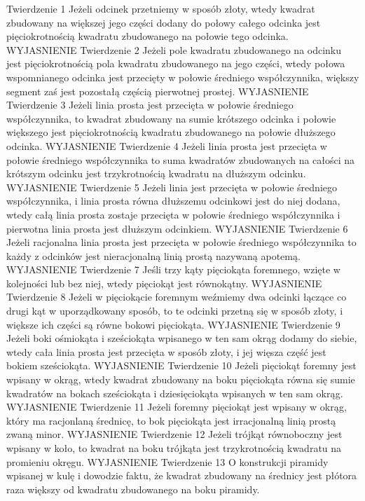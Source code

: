     Twierdzenie 1
    Jeżeli odcinek przetniemy w sposób złoty, wtedy kwadrat zbudowany na większej jego części dodany do połowy całego odcinka jest pięciokrotnością kwadratu zbudowanego na połowie tego odcinka.
    WYJASNIENIE
Twierdzenie 2
    Jeżeli pole kwadratu zbudowanego na odcinku jest pięciokrotnością pola kwadratu zbudowanego na jego części, wtedy połowa wspomnianego odcinka jest przecięty w połowie średniego współczynnika, większy segment zaś jest pozostałą częścią pierwotnej prostej.
    WYJASNIENIE
Twierdzenie 3
    Jeżeli linia prosta jest przecięta w połowie średniego współczynnika, to kwadrat zbudowany na sumie krótszego odcinka i połowie większego jest pięciokrotnością kwadratu zbudowanego na połowie dłuższego odcinka.
    WYJASNIENIE
Twierdzenie 4
    Jeżeli linia prosta jest przecięta w połowie średniego współczynnika to suma kwadratów zbudowanych na całości na krótszym odcinku jest trzykrotnością kwadratu na dłuższym odcinku.
    WYJASNIENIE
Twierdzenie 5
    Jeżeli linia jest przecięta w połowie średniego współczynnika, i linia prosta równa dłuższemu odcinkowi jest do niej dodana, wtedy całą linia prosta zostaje przecięta w połowie średniego współczynnika i pierwotna linia prosta jest dłuższym odcinkiem.
    WYJASNIENIE
Twierdzenie 6
    Jeżeli racjonalna linia prosta jest przecięta w połowie średniego współczynnika to każdy z odcinków jest nieracjonalną linią prostą nazywaną apotemą.
    WYJASNIENIE
Twierdzenie 7
    Jeśli trzy kąty pięciokąta foremnego, wzięte w kolejności lub bez niej, wtedy pięciokąt jest równokątny.
    WYJASNIENIE
Twierdzenie 8
    Jeżeli w pięciokącie foremnym weźmiemy dwa odcinki łączące co drugi kąt w uporządkowany sposób, to te odcinki przetną się w sposób złoty, i większe ich części są równe bokowi pięciokąta.
    WYJASNIENIE
Twierdzenie 9
    Jeżeli boki ośmiokąta i sześciokąta wpisanego w ten sam okrąg dodamy do siebie, wtedy cała linia prosta jest przecięta w sposób złoty, i jej więsza część jest bokiem sześciokąta.
    WYJASNIENIE
Twierdzenie 10
    Jeżeli pięciokąt foremny jest wpisany w okrąg, wtedy kwadrat zbudowany na boku pięciokąta równa się sumie kwadratów na bokach sześciokąta i dziesięciokąta wpisanych w ten sam okrąg.
    WYJASNIENIE
Twierdzenie 11
    Jeżeli foremny pięciokąt jest wpisany w okrąg, który ma racjonlaną średnicę, to bok pięciokąta jest irracjonalną linią prostą zwaną minor.
    WYJASNIENIE
Twierdzenie 12
    Jeżeli trójkąt równoboczny jest wpisany w koło, to kwadrat na boku trójkąta jest trzykrotnością kwadratu na promieniu okręgu.
    WYJASNIENIE
Twierdzenie 13
    O konstrukcji piramidy wpisanej w kulę i dowodzie faktu, że kwadrat zbudowany na średnicy jest płótora raza większy od kwadratu zbudowanego na boku piramidy.

